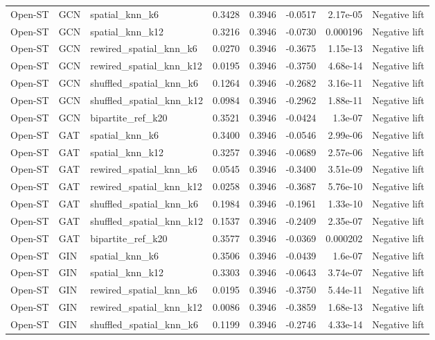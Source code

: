 \begin{longtable}{lllrrrrl}
Open-ST & GCN & spatial\_knn\_k6 & 0.3428 & 0.3946 & -0.0517 & 2.17e-05 & Negative lift \\
Open-ST & GCN & spatial\_knn\_k12 & 0.3216 & 0.3946 & -0.0730 & 0.000196 & Negative lift \\
Open-ST & GCN & rewired\_spatial\_knn\_k6 & 0.0270 & 0.3946 & -0.3675 & 1.15e-13 & Negative lift \\
Open-ST & GCN & rewired\_spatial\_knn\_k12 & 0.0195 & 0.3946 & -0.3750 & 4.68e-14 & Negative lift \\
Open-ST & GCN & shuffled\_spatial\_knn\_k6 & 0.1264 & 0.3946 & -0.2682 & 3.16e-11 & Negative lift \\
Open-ST & GCN & shuffled\_spatial\_knn\_k12 & 0.0984 & 0.3946 & -0.2962 & 1.88e-11 & Negative lift \\
Open-ST & GCN & bipartite\_ref\_k20 & 0.3521 & 0.3946 & -0.0424 & 1.3e-07 & Negative lift \\
Open-ST & GAT & spatial\_knn\_k6 & 0.3400 & 0.3946 & -0.0546 & 2.99e-06 & Negative lift \\
Open-ST & GAT & spatial\_knn\_k12 & 0.3257 & 0.3946 & -0.0689 & 2.57e-06 & Negative lift \\
Open-ST & GAT & rewired\_spatial\_knn\_k6 & 0.0545 & 0.3946 & -0.3400 & 3.51e-09 & Negative lift \\
Open-ST & GAT & rewired\_spatial\_knn\_k12 & 0.0258 & 0.3946 & -0.3687 & 5.76e-10 & Negative lift \\
Open-ST & GAT & shuffled\_spatial\_knn\_k6 & 0.1984 & 0.3946 & -0.1961 & 1.33e-10 & Negative lift \\
Open-ST & GAT & shuffled\_spatial\_knn\_k12 & 0.1537 & 0.3946 & -0.2409 & 2.35e-07 & Negative lift \\
Open-ST & GAT & bipartite\_ref\_k20 & 0.3577 & 0.3946 & -0.0369 & 0.000202 & Negative lift \\
Open-ST & GIN & spatial\_knn\_k6 & 0.3506 & 0.3946 & -0.0439 & 1.6e-07 & Negative lift \\
Open-ST & GIN & spatial\_knn\_k12 & 0.3303 & 0.3946 & -0.0643 & 3.74e-07 & Negative lift \\
Open-ST & GIN & rewired\_spatial\_knn\_k6 & 0.0195 & 0.3946 & -0.3750 & 5.44e-11 & Negative lift \\
Open-ST & GIN & rewired\_spatial\_knn\_k12 & 0.0086 & 0.3946 & -0.3859 & 1.68e-13 & Negative lift \\
Open-ST & GIN & shuffled\_spatial\_knn\_k6 & 0.1199 & 0.3946 & -0.2746 & 4.33e-14 & Negative lift \\

\end{longtable}
